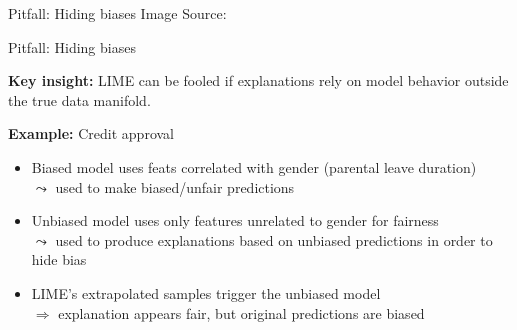 \documentclass[10pt,compress,t,notes=noshow, xcolor=table]{beamer}
\begin{document}
\begin{frame}{Pitfall: Hiding biases }
	    Image Source: 
\end{frame}



\begin{frame}{Pitfall: Hiding biases }

\textbf{Key insight:} LIME can be fooled if explanations rely on model behavior outside the true data manifold.

\lz
   
\textbf{Example:} Credit approval
  \begin{itemize}
    \item Biased model uses feats correlated with gender (parental leave duration)\\
    $\leadsto$ used to make biased/unfair predictions
    \item Unbiased model uses only features unrelated to gender for fairness\\%
    $\leadsto$ used to produce explanations based on unbiased predictions in order to hide bias
    \item LIME’s extrapolated samples trigger the unbiased model\\
    $\Rightarrow$ explanation appears fair, but original predictions are biased
  \end{itemize}

\end{frame}
\end{document}
